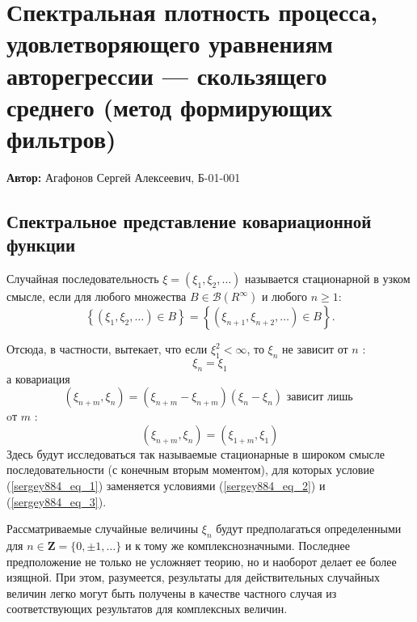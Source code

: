 

\section{Спектральная плотность процесса, удовлетворяющего уравнениям авторегрессии — скользящего среднего (метод формирующих фильтров)}

\textbf{Автор:} Агафонов Сергей Алексеевич, Б-01-001

\subsection{Спектральное представление ковариационной функции}

\begin{definition} Случайная последовательность $\xi=\left(\xi_1, \xi_2, \ldots\right)$ называется стационарной в узком смысле, если для любого множества $B \in \mathscr{B}\left(R^{\infty}\right)$ и любого $n \geqslant 1$:
\begin{equation}\label{sergey884_eq_1}
\left\{\left(\xi_1, \xi_2, \ldots\right) \in B\right\}=\left\{\left(\xi_{n+1}, \xi_{n+2}, \ldots\right) \in B\right\} . 
\end{equation}
\end{definition}
Отсюда, в частности, вытекает, что если $\xi_1^2<\infty$, то $\xi_n$ не зависит от $n$ :
\begin{equation}\label{sergey884_eq_2}
\xi_n=\xi_1
\end{equation}
а ковариация
$$
\left(\xi_{n+m}, \xi_n\right)=\left(\xi_{n+m}-\xi_{n+m}\right)\left(\xi_n-\xi_n\right) \text { зависит лишь }
$$
oт $m$ :
\begin{equation}\label{sergey884_eq_3}
\left(\xi_{n+m}, \xi_n\right)=\left(\xi_{1+m}, \xi_1\right)
\end{equation}
Здесь будут исследоваться так называемые стационарные в широком смысле последовательности (с конечным вторым моментом), для которых условие (\ref{sergey884_eq_1}) заменяется условиями (\ref{sergey884_eq_2}) и (\ref{sergey884_eq_3}).

Рассматриваемые случайные величины $\xi_n$ будут предполагаться определенными для $n \in \mathbf{Z}=\{0, \pm 1, \ldots\}$ и к тому же комплекснозначными. Последнее предположение не только не усложняет теорию, но и наоборот делает ее более изящной. При этом, разумеется, результаты для действительных случайных величин легко могут быть получены в качестве частного случая из соответствующих результатов для комплексных величин.

